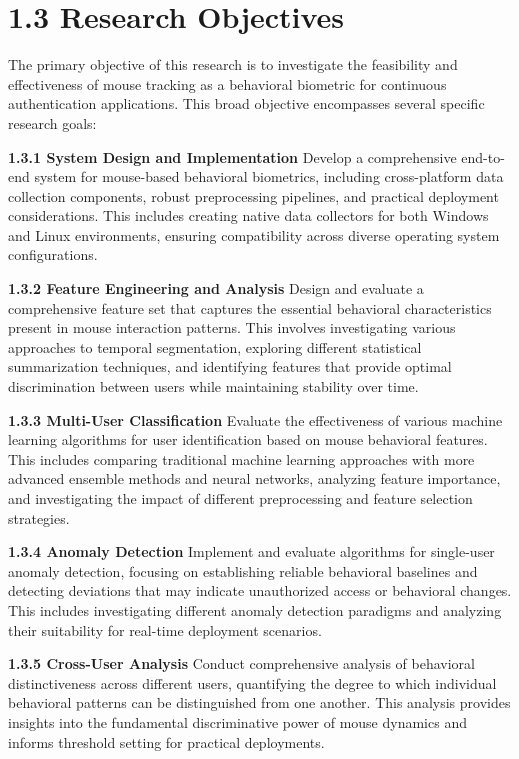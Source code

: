 \documentclass[
  12pt,
  a4paper,
]{report}
\begin{document}
\section{1.3 Research Objectives}\label{research-objectives}

The primary objective of this research is to investigate the feasibility
and effectiveness of mouse tracking as a behavioral biometric for
continuous authentication applications. This broad objective encompasses
several specific research goals:

\textbf{1.3.1 System Design and Implementation} Develop a comprehensive
end-to-end system for mouse-based behavioral biometrics, including
cross-platform data collection components, robust preprocessing
pipelines, and practical deployment considerations. This includes
creating native data collectors for both Windows and Linux environments,
ensuring compatibility across diverse operating system configurations.

\textbf{1.3.2 Feature Engineering and Analysis} Design and evaluate a
comprehensive feature set that captures the essential behavioral
characteristics present in mouse interaction patterns. This involves
investigating various approaches to temporal segmentation, exploring
different statistical summarization techniques, and identifying features
that provide optimal discrimination between users while maintaining
stability over time.

\textbf{1.3.3 Multi-User Classification} Evaluate the effectiveness of
various machine learning algorithms for user identification based on
mouse behavioral features. This includes comparing traditional machine
learning approaches with more advanced ensemble methods and neural
networks, analyzing feature importance, and investigating the impact of
different preprocessing and feature selection strategies.

\textbf{1.3.4 Anomaly Detection} Implement and evaluate algorithms for
single-user anomaly detection, focusing on establishing reliable
behavioral baselines and detecting deviations that may indicate
unauthorized access or behavioral changes. This includes investigating
different anomaly detection paradigms and analyzing their suitability
for real-time deployment scenarios.

\textbf{1.3.5 Cross-User Analysis} Conduct comprehensive analysis of
behavioral distinctiveness across different users, quantifying the
degree to which individual behavioral patterns can be distinguished from
one another. This analysis provides insights into the fundamental
discriminative power of mouse dynamics and informs threshold setting for
practical deployments.
\end{document}
